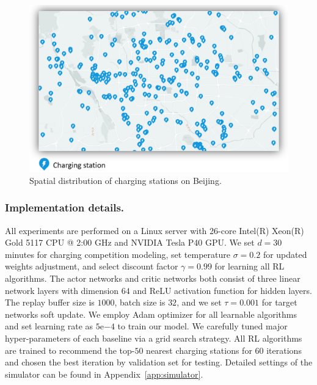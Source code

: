 \documentclass[sigconf]{acmart}
\newcommand{\beijing}{{\sc Beijing}\xspace}
\newcommand\figref[1]{Figure~\ref{#1}}
\newcommand\appref[1]{Appendix~\ref{#1}}
\begin{document}

\begin{figure}[tb]
	\centering
	\includegraphics[width=0.85\columnwidth]{figs/beijing_cs.png}
	\caption{Spatial distribution of charging stations on \beijing.}
	\vspace{-1mm}
	\label{fig:beijing_cs}
\end{figure}


\subsubsection{Implementation details.}
All experiments are performed on a Linux server with 26-core Intel(R) Xeon(R) Gold 5117 CPU @ 2:00 GHz and
NVIDIA Tesla P40 GPU. We set $d=30$ minutes for charging competition modeling, set temperature $\sigma=0.2$ for updated weights adjustment, and select discount factor $\gamma=0.99$ for learning all RL algorithms.
The actor networks and critic networks both consist of three linear network layers with dimension $64$ and ReLU activation function for hidden layers. The replay buffer size is $1000$, batch size is $32$, and we set $\tau=0.001$ for target networks soft update.
We employ Adam optimizer for all learnable algorithms and set learning rate as $5\mathrm{e}{-4}$ to train our model. We carefully tuned major hyper-parameters of each baseline via a grid search strategy. All RL algorithms are trained to recommend the top-$50$ nearest charging stations for $60$ iterations and chosen the best iteration by validation set for testing. Detailed settings of the simulator can be found in \appref{app:simulator}. 
\end{document}

